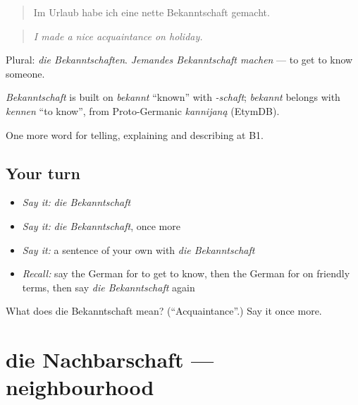 \begin{quote}
Im Urlaub habe ich eine nette Bekanntschaft gemacht.
\end{quote}

\begin{quote}
\emph{I made a nice acquaintance on holiday.}
\end{quote}

Plural: \emph{die Bekanntschaften}. \emph{Jemandes Bekanntschaft machen} — to get to know someone.

\begin{cousinweb}
\emph{Bekanntschaft} is built on \emph{bekannt} \textquotedblleft{}known\textquotedblright{} with \emph{-schaft}; \emph{bekannt} belongs with \emph{kennen} \textquotedblleft{}to know\textquotedblright{}, from Proto-Germanic \emph{kannijaną} (EtymDB).
\end{cousinweb}

\begin{grammarlens}[title={What you've built}]
One more word for telling, explaining and describing at B1.
\end{grammarlens}

\subsection*{Your turn}
\begin{itemize}
\raggedright
  \item \emph{Say it:} \emph{die Bekanntschaft}
  \item \emph{Say it:} \emph{die Bekanntschaft}, once more
  \item \emph{Say it:} a sentence of your own with \emph{die Bekanntschaft}
  \item \emph{Recall:} say the German for to get to know, then the German for on friendly terms, then say \emph{die Bekanntschaft} again
\end{itemize}

\begin{tcolorbox}[breakable,colback=teal!4,colframe=teal!35!black,title={Before you move on}]
What does die Bekanntschaft mean? (\textquotedblleft{}Acquaintance\textquotedblright{}.) Say it once more.
\end{tcolorbox}
\section[die Nachbarschaft]{die Nachbarschaft — neighbourhood}

\label{lesson:GE-C498-nachbarschaft}



